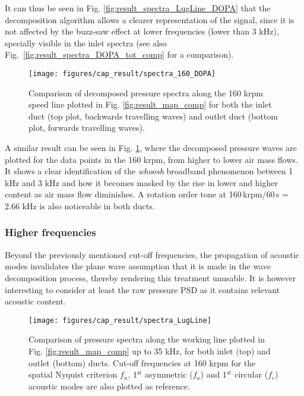 It can thus be seen in Fig. \ref{fig:result_spectra_LugLine_DOPA} that the decomposition algorithm allows a clearer representation of the signal, since it is not affected by the buzz-saw effect at lower frequencies (lower than 3 kHz), specially visible in the inlet spectra (see also Fig.~\ref{fig:result_spectra_DOPA_tot_comp} for a comparison).

\begin{figure}[tbh!]
\centering
\texttt{[image: figures/cap\_result/spectra\_160\_DOPA]}
\caption[Decomposed plane wave spectra along the 160 krpm line]{Comparison of decomposed pressure spectra along the 160 krpm speed line plotted in Fig. \ref{fig:result_map_comp} for both the inlet duct (top plot, backwards travelling waves) and outlet duct (bottom plot, forwards travelling waves).}
\label{fig:result_spectra_160_DOPA}
\end{figure}

A similar result can be seen in Fig. \ref{fig:result_spectra_160_DOPA}, where the decomposed pressure waves are plotted for the data points in the 160 krpm, from higher to lower air mass flows. It shows a clear identification of the \emph{whoosh} broadband phenomenon between 1 kHz and 3 kHz and how it becomes masked by the rise in lower and higher content as air mass flow diminishes. A rotation order tone at 160\,krpm/60\,s = 2.66 kHz is also noticeable in both ducts.

\subsubsection{Higher frequencies}
\label{sub:result_high_freq}

Beyond the previously mentioned cut-off frequencies, the propagation of acoustic modes invalidates the plane wave assumption that it is made in the wave decomposition process, thereby rendering this treatment unusable. It is however interesting to consider at least the raw pressure PSD as it contains relevant acoustic content.

\begin{figure}[b!]
\centering
\texttt{[image: figures/cap\_result/spectra\_LugLine]}
\caption[Spectra along the working line in the full range]{Comparison of pressure spectra along the working line  plotted in Fig. \ref{fig:result_map_comp} up to 35 kHz, for both inlet (top) and outlet (bottom) ducts. Cut-off frequencies at 160 krpm for the spatial Nyquist criterion $f_n$, 1${}^\text{st}$ asymmetric ($f_a$) and 1${}^\text{st}$ circular ($f_c$) acoustic modes are also plotted as reference.}
\label{fig:result_spectra_LugLine}
\end{figure}

